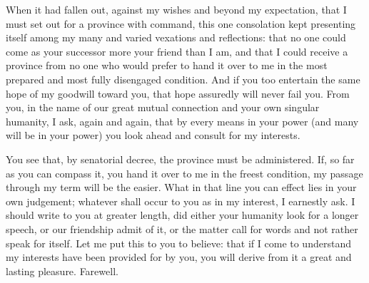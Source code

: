 

 When it had fallen out, against my wishes and beyond my expectation, that I must set out for a province with command, this one consolation kept presenting itself among my many and varied vexations and reflections: that no one could come as your successor more your friend than I am, and that I could receive a province from no one who would prefer to hand it over to me in the most prepared and most fully disengaged condition. And if you too entertain the same hope of my goodwill toward you, that hope assuredly will never fail you. From you, in the name of our great mutual connection and your own singular humanity, I ask, again and again, that by every means in your power (and many will be in your power) you look ahead and consult for my interests.

 You see that, by senatorial decree, the province must be administered. If, so far as you can compass it, you hand it over to me in the freest condition, my passage through my term will be the easier. What in that line you can effect lies in your own judgement; whatever shall occur to you as in my interest, I earnestly ask. I should write to you at greater length, did either your humanity look for a longer speech, or our friendship admit of it, or the matter call for words and not rather speak for itself. Let me put this to you to believe: that if I come to understand my interests have been provided for by you, you will derive from it a great and lasting pleasure. Farewell.
